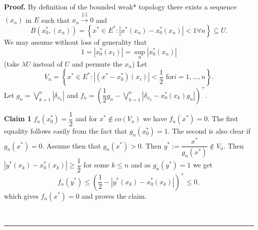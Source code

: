 \documentclass[12pt]{article}%
\newenvironment{proof}[1][Proof]{\noindent\textbf{#1.} }{\ \rule{0.5em}{0.5em}}
\begin{document}
\begin{proof}
By definition of the bounded weak* topology \cite[Definition 2.7.1]{b-2554}
there exists a sequence $\left(  x_{n}\right)  $ in $E$ such that
$x_{n}\overset{\left\Vert .\right\Vert }{\longrightarrow}0$ and%
\[
B\left(  x_{0}^{\ast},\left(  x_{n}\right)  \right)  =\left\{  x^{\ast}\in
E^{\ast}:\left\vert x^{\ast}\left(  x_{n}\right)  -x_{0}^{\ast}\left(
x_{n}\right)  \right\vert <1\forall n\right\}  \subseteq U.
\]
We may assume without loss of generality that
\[
1=\left\vert x_{0}^{\ast}\left(  x_{1}\right)  \right\vert =\sup
\limits_{n}\left\vert x_{0}^{\ast}\left(  x_{n}\right)  \right\vert
\]
(take $\lambda U$ instead of $U$ and permute the $x_{n}$) Let
\[
V_{n}=\left\{  x^{\ast}\in E^{\ast}:\left\vert \left(  x^{\ast}-x_{0}^{\ast
}\right)  \left(  x_{i}\right)  \right\vert <\dfrac{1}{2}\text{ for
}i=1,...,n\right\}  .
\]
Let $g_{n}=\bigvee\limits_{k=1}^{n}\left\vert \delta_{x_{k}}\right\vert $ and
$f_{n}=\left(  \dfrac{1}{2}g_{n}-\bigvee\limits_{k=1}^{n}\left\vert
\delta_{x_{k}}-x_{0}^{\ast}\left(  x_{k}\right)  g_{n}\right\vert \right)
^{+}.$

\textbf{Claim 1 }$f_{n}\left(  x_{0}^{\ast}\right)  =\dfrac{1}{2}$ and for
$x^{\ast}\notin co\left(  V_{n}\right)  $ we have $f_{n}\left(  x^{\ast
}\right)  =0.$ The first equality follows easily from the fact that
$g_{n}\left(  x_{0}^{\ast}\right)  =1.$ The second is also clear if
$g_{n}\left(  x^{\ast}\right)  =0.$ Assume then that $g_{n}\left(  x^{\ast
}\right)  >0.$ Then $y^{\ast}:=\dfrac{x^{\ast}}{g_{n}\left(  x^{\ast}\right)
}\notin V_{n}.$ Then $\left\vert y^{\ast}\left(  x_{k}\right)  -x_{0}^{\ast
}\left(  x_{k}\right)  \right\vert \geq\dfrac{1}{2}$ for some $k\leq n$ and as
$g_{n}\left(  y^{\ast}\right)  =1$ we get
\[
f_{n}\left(  y^{\ast}\right)  \leq\left(  \dfrac{1}{2}-\left\vert y^{\ast
}\left(  x_{k}\right)  -x_{0}^{\ast}\left(  x_{k}\right)  \right\vert \right)
^{+}\leq0,
\]
which gives $f_{n}\left(  x^{\ast}\right)  =0$ and proves the claim.


\end{proof}
\end{document}

